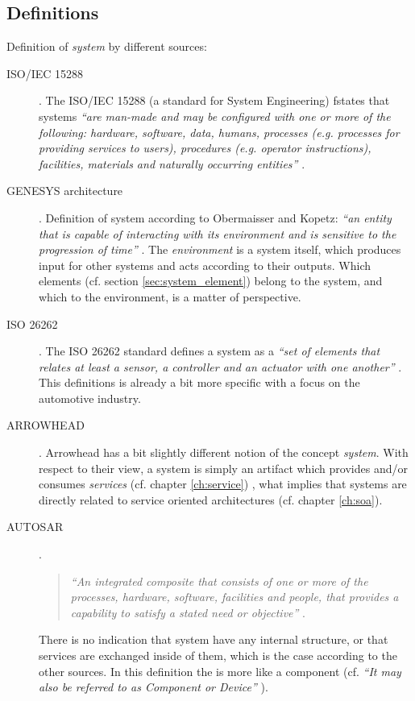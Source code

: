\subsection{Definitions}
Definition of \emph{system} by different sources:
\begin{description}
\item [ISO/IEC 15288] .
The ISO/IEC 15288 (a standard for System Engineering) fstates that systems \textit{``are man-made and may be configured with one or more of the following: hardware, software, data, humans, processes (e.g. processes for providing services to users), procedures (e.g. operator instructions), facilities, materials and naturally occurring entities''} \cite{ISO_15288}.

\item [GENESYS architecture].
Definition of system according to Obermaisser and Kopetz: \emph{``an entity that is capable of interacting with its environment and is sensitive to the progression of time''} \cite[p.7]{genesys}.
The \emph{environment} is a system itself, which produces input for other systems and acts according to their outputs. Which elements (cf. section \ref{sec:system_element}) belong to the system, and which to the environment, is a matter of perspective. 

\item [ISO 26262].
The ISO 26262 standard defines a system as a \emph{``set of elements that relates at least a sensor, a controller and an actuator with one another''} \cite{iso26262:1}. This definitions is already a bit more specific with a focus on the automotive industry.

\item [ARROWHEAD].
Arrowhead has a bit slightly different notion of the concept \emph{system}. With respect to their view, a system is simply an artifact which provides and/or consumes \emph{services} (cf. chapter \ref{ch:service}) \cite{arrowhead_inpr}, what implies that systems are directly related to service oriented architectures (cf. chapter \ref{ch:soa}).

\item [AUTOSAR].
\begin{quote}
\emph{``An integrated composite that consists of one or more of the processes, hardware, software, facilities and people, that provides a capability to satisfy a stated need or objective''} \cite{autosar_glossary}.
\end{quote}

There is no indication that system have any internal structure, or that services are exchanged inside of them, which is the case according to the other sources. In this definition the is more like a component (cf. \emph{``It may also be referred to as Component or Device''} \cite{arrowhead_inpr}).
\end{description}

